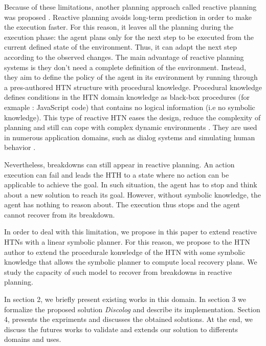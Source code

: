 \documentclass[conference]{IEEEtran}
\begin{document}
\par Because of these limitations, another planning approach called reactive planning was proposed \cite{firby1987investigation}. Reactive planning avoids long-term prediction in order to make the execution faster. For this reason, it leaves all the planning during the execution phase: the agent plans only for the next step to be executed from the current defined state of the environment. Thus, it can adapt the next step according to the observed changes. The main advantage of reactive planning systems is they don't need a complete definition of the environment. Instead, they aim to define the policy of the agent in its environment by running through a pres-authored HTN structure with  procedural  knowledge. Procedural knowledge defines conditions in the HTN domain knowledge as black-box procedures (for exmaple : JavaScript code) that contains no logical information (i.e no symbolic knowledge). This type of reactive HTN  eases the design, reduce the complexity of planning and still can cope with complex dynamic environments \cite {brom2005hierarchical}. They are used in numerous application domains, such as dialog systems \cite{bohus2003ravenclaw} and simulating human behavior \cite{brom2005hierarchical}.
\par Nevertheless, breakdowns can still appear in reactive planning. An action execution can fail and leads the HTH to a state where no action can be applicable to achieve the goal. 
In such situation, the agent has to stop and think about a new solution to reach its goal. However, without symbolic knowledge, the agent has nothing to reason about. The execution thus stops and the agent cannot recover from its breakdown.

 \par  In order to deal with this limitation, we propose in this paper to extend reactive HTNs with a linear symbolic planner. For this reason, we propose to  the HTN author to extend the procedurale konwledge of the HTN with some symbolic knowledge that allows the symbolic planner to  compute local recovery plans. We study the capacity of such  model to recover from breakdowns in reactive planning. 

\par In section 2, we briefly present existing works in this domain. In section 3 we formalize the proposed solution \textit{Discolog} and describe its implementation. Section 4, presents the expriments and discusses the obtained solutions. At the end, we discuss the futures works to validate and extends our solution to differents domains and uses.
\end{document}
